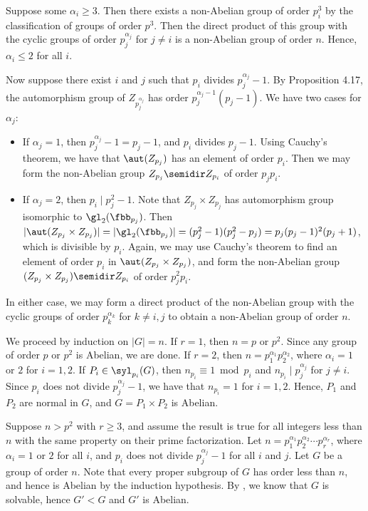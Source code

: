 \begin{soliff}
    \rightimp Suppose some $\alpha_i \geq 3$.
    Then there exists a non-Abelian group of order $p_i^3$ by the classification of groups of order $p^3$.
    Then the direct product of this group with the cyclic groups of order $p_j^{\alpha_j}$ for $j \neq i$ is a non-Abelian group of order $n$.
    Hence, $\alpha_i \leq 2$ for all $i$.

    Now suppose there exist $i$ and $j$ such that $p_i$ divides $p_j^{\alpha_j} - 1$.
    By Proposition 4.17, the automorphism group of $Z_{p_j^{\alpha_j}}$ has order $p_j^{\alpha_j - 1}(p_j - 1)$.
    We have two cases for $\alpha_j$:
    \begin{itemize}
        \item If $\alpha_j = 1$, then $p_j^{\alpha_j} - 1 = p_j - 1$, and $p_i$ divides $p_j - 1$.
        Using Cauchy's theorem, we have that $\aut(Z_{p_j})$ has an element of order $p_i$.
        Then we may form the non-Abelian group $Z_{p_j} \semidir Z_{p_i}$ of order $p_jp_i$.
        \item If $\alpha_j = 2$, then $p_i \mid p_j^2 - 1$.
        Note that $Z_{p_j} \times Z_{p_j}$ has automorphism group isomorphic to $\gl_2(\fbb_{p_j})$.
        Then $|\aut(Z_{p_j} \times Z_{p_j})| = |\gl_2(\fbb_{p_j})| = (p_j^2 - 1)(p_j^2 - p_j) = p_j(p_j - 1)^2(p_j + 1)$, which is divisible by $p_i$.
        Again, we may use Cauchy's theorem to find an element of order $p_i$ in $\aut(Z_{p_j} \times Z_{p_j})$, and form the non-Abelian group $(Z_{p_j} \times Z_{p_j}) \semidir Z_{p_i}$ of order $p_j^2p_i$.
    \end{itemize}
    In either case, we may form a direct product of the non-Abelian group with the cyclic groups of order $p_k^{\alpha_k}$ for $k \neq i, j$ to obtain a non-Abelian group of order $n$.

    \leftimp We proceed by induction on $|G| = n$.
    If $r = 1$, then $n = p$ or $p^2$.
    Since any group of order $p$ or $p^2$ is Abelian, we are done.
    If $r = 2$, then $n = p_1^{\alpha_1}p_2^{\alpha_2}$, where $\alpha_i = 1$ or $2$ for $i = 1, 2$.
    If $P_i \in \syl_{p_i}(G)$, then $n_{p_i} \equiv 1 \bmod p_i$ and $n_{p_i} \mid p_j^{\alpha_j}$ for $j \neq i$.
    Since $p_i$ does not divide $p_j^{\alpha_j} - 1$, we have that $n_{p_i} = 1$ for $i = 1, 2$.
    Hence, $P_1$ and $P_2$ are normal in $G$, and $G = P_1 \times P_2$ is Abelian.

    Suppose $n > p^2$ with $r \geq 3$, and assume the result is true for all integers less than $n$ with the same property on their prime factorization.
    Let $n = p_1^{\alpha_1} p_2^{\alpha_2} \cdots p_r^{\alpha_r}$, where $\alpha_i = 1$ or $2$ for all $i$, and $p_i$ does not divide $p_j^{\alpha_j} - 1$ for all $i$ and $j$.
    Let $G$ be a group of order $n$.
    Note that every proper subgroup of $G$ has order less than $n$, and hence is Abelian by the induction hypothesis.
    By , we know that $G$ is solvable, hence $G' < G$ and $G'$ is Abelian.


\end{soliff}

